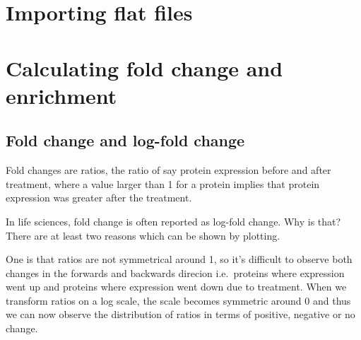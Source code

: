 \documentclass[12pt,]{book}
\newenvironment{Shaded}{\begin{snugshade}}{\end{snugshade}}
\newcommand{\KeywordTok}[1]{\textcolor[rgb]{0.13,0.29,0.53}{\textbf{#1}}}
\newcommand{\DataTypeTok}[1]{\textcolor[rgb]{0.13,0.29,0.53}{#1}}
\newcommand{\DecValTok}[1]{\textcolor[rgb]{0.00,0.00,0.81}{#1}}
\newcommand{\StringTok}[1]{\textcolor[rgb]{0.31,0.60,0.02}{#1}}
\newcommand{\OperatorTok}[1]{\textcolor[rgb]{0.81,0.36,0.00}{\textbf{#1}}}
\newcommand{\NormalTok}[1]{#1}
\theoremstyle{definition}
\theoremstyle{definition}
\theoremstyle{definition}
\theoremstyle{remark}
\begin{document}
\section{Importing flat files}\label{importing-flat-files}

\section{Calculating fold change and
enrichment}\label{calculating-fold-change-and-enrichment}

\subsection{Fold change and log-fold
change}\label{fold-change-and-log-fold-change}

Fold changes are ratios, the ratio of say protein expression before and
after treatment, where a value larger than 1 for a protein implies that
protein expression was greater after the treatment.

In life sciences, fold change is often reported as log-fold change. Why
is that? There are at least two reasons which can be shown by plotting.

One is that ratios are not symmetrical around 1, so it's difficult to
observe both changes in the forwards and backwards direcion
i.e.~proteins where expression went up and proteins where expression
went down due to treatment. When we transform ratios on a log scale, the
scale becomes symmetric around 0 and thus we can now observe the
distribution of ratios in terms of positive, negative or no change.

\begin{Shaded}
\end{Shaded}
\end{document}
